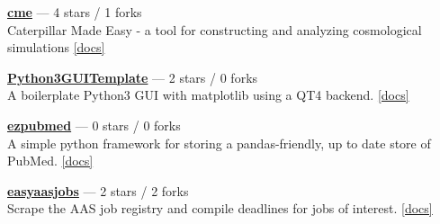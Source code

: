 \item \href{https://github.com/bgriffen/cme}{{\bf cme}} --- 4 stars / 1 forks \\
Caterpillar Made Easy - a tool for constructing and analyzing cosmological simulations \href{}{[docs]}

\item \href{https://github.com/bgriffen/Python3GUITemplate}{{\bf Python3GUITemplate}} --- 2 stars / 0 forks \\
A boilerplate Python3 GUI with matplotlib using a QT4 backend. \href{http://brendangriffen.com/creating-a-GUI-in-Python/}{[docs]}

\item \href{https://github.com/bgriffen/ezpubmed}{{\bf ezpubmed}} --- 0 stars / 0 forks \\
A simple python framework for storing a pandas-friendly, up to date store of PubMed. \href{}{[docs]}

\item \href{https://github.com/bgriffen/easyaasjobs}{{\bf easyaasjobs}} --- 2 stars / 2 forks \\
Scrape the AAS job registry and compile deadlines for jobs of interest. \href{}{[docs]}